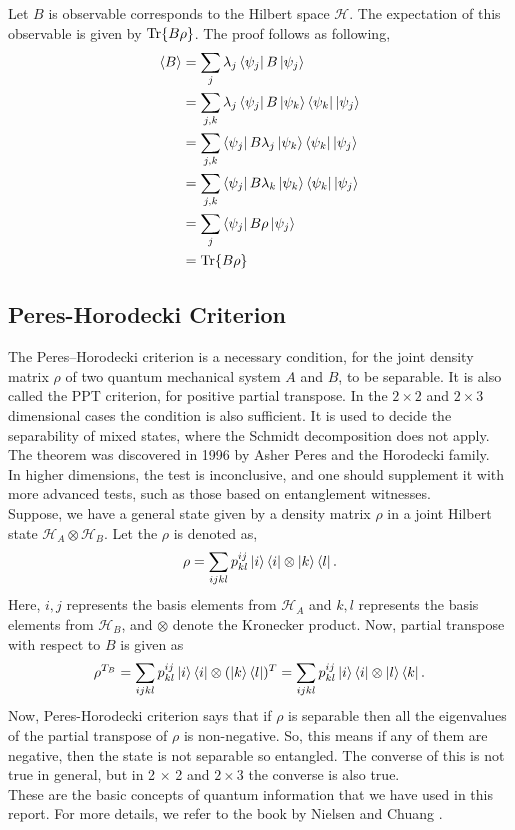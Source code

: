 \documentclass{scrartcl}
\begin{document}
Let $B$ is observable corresponds to the Hilbert space $\mathcal{H}$. The expectation of this observable is given by $\Tr{B \rho}$. The proof follows as following,
\begin{align*}
    \langle B \rangle &= \sum_j \lambda_j \bra{\psi_j} B \ket{\psi_j} \\
    &= \sum_{j,k} \lambda_j \bra{\psi_j} B \ket{\psi_k} \bra{\psi_k} \ket{\psi_j} \\
    &= \sum_{j,k} \bra{\psi_j} B \lambda_j \ket{\psi_k} \bra{\psi_k} \ket{\psi_j} \\
    &= \sum_{j,k} \bra{\psi_j} B \lambda_k \ket{\psi_k} \bra{\psi_k} \ket{\psi_j} \\
    &= \sum_{j} \bra{\psi_j} B \rho \ket{\psi_j} \\
    &= \Tr{B \rho}
\end{align*}

\subsection{Peres-Horodecki Criterion}
The Peres–Horodecki criterion is a necessary condition, for the joint density matrix $\rho$ of two quantum mechanical system $A$ and $B$, to be separable. It is also called the PPT criterion, for positive partial transpose. In the $2\times2$ and $2\times3$ dimensional cases the condition is also sufficient. It is used to decide the separability of mixed states, where the Schmidt decomposition does not apply. The theorem was discovered in 1996 by Asher Peres and the Horodecki family.\\[0.3cm]
In higher dimensions, the test is inconclusive, and one should supplement it with more advanced tests, such as those based on entanglement witnesses. \\[0.3cm]
Suppose, we have a general state given by a density matrix $\rho$ in a joint Hilbert state $\mathcal{H}_A \otimes \mathcal{H}_B$. Let the $\rho $ is denoted as, \begin{equation*}
	\rho = \sum_{ijkl} p^{ij}_{kl} \ket{i}\bra{i}\otimes \ket{k}\bra{l}.
\end{equation*}
Here, $i,j$ represents the basis elements from $\mathcal{H}_A$ and $k,l$ represents the basis elements from $\mathcal{H}_B$, and $\otimes$ denote the Kronecker product. %
Now, partial transpose with respect to $B$ is given as 
\begin{equation*}
	\rho^{T_B} = \sum_{ijkl} p^{ij}_{kl} \ket{i}\bra{i}\otimes (\ket{k}\bra{l})^{T} = \sum_{ijkl} p^{ij}_{kl} \ket{i}\bra{i}\otimes \ket{l}\bra{k}.
\end{equation*}
Now, Peres-Horodecki criterion says that if $\rho$ is separable then all the eigenvalues of the partial transpose of $\rho$ is non-negative. So, this means if any of them are negative, then the state is not separable so entangled. The converse of this is not true in general, but in 2 $\times$ 2 and $2 \times 3$ the converse is also true. \\[0.3cm]
These are the basic concepts of quantum information that we have used in this report. For more details, we refer to the book by Nielsen and Chuang \cite{Nielsen_Chuang_2010}.
\newpage
\end{document}
